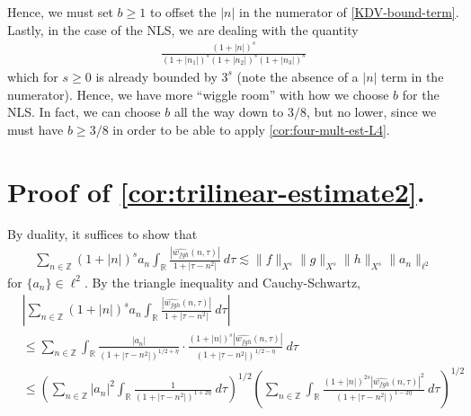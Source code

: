 \documentclass[12pt,reqno]{amsart}
\numberwithin{equation}{section}  %
\numberwithin{figure}{section}
\newcommand{\rr}{\mathbb{R}}
\newcommand{\zz}{\mathbb{Z}}
\newcommand{\wh}{\widehat}
\theoremstyle{plain}
\theoremstyle{definition}
\theoremstyle{remark}
\begin{document}
Hence, we must set $b \ge 1$ to offset the $|n|$ in the numerator of 
\eqref{KDV-bound-term}.
Lastly, in the case of the NLS, we are dealing with the quantity
\begin{equation*}
	\begin{split}
		\frac{\left (1 + |n| \right ) ^s}{\left (1 + |n_1| \right ) ^s \left (1 + |n_2| \right ) ^s \left (1 + |n_3| \right ) ^s} 
	\end{split}
\end{equation*}
which for $s \ge 0$
is already bounded by $3^s$ (note the absence of a $|n|$ term in the
numerator). Hence, we have more ``wiggle room'' with how
we choose $b$ for the NLS. In fact, we can choose $b$ all the way down to $3/8$, but no
lower, since we must have $b \ge 3/8$ in order to be able to apply
\autoref{cor:four-mult-est-L4}. 
%
%
%
%
\section{Proof of \autoref{cor:trilinear-estimate2}.}
By duality, it suffices to show that 
%
\begin{equation*}
	\begin{split}
		\sum_{n \in \zz} \left (1 + |n| \right )^{s}
		a_n \int_{\rr} \frac{|\wh{w_{fgh}}(n, \tau)|}{1 
		+ | \tau - n^2 |} \ d \tau \lesssim \|f\|_{X^s} \|g\|_{X^s} \|h\|_{X^s}
		\|a_n \|_{\ell^2}
	\end{split}
\end{equation*}
%
for $\{a_n\} \in \ell^2$. By the triangle inequality 
and Cauchy-Schwartz,
%
\begin{equation}
	\label{1m}
	\begin{split}
		& | \sum_{n \in \zz} \left (1 + |n| \right )^{s} a_n
		\int_{\rr}\frac{| \wh{w_{fgh}}(n, \tau) |}{1 + | \tau - n^2 |} \ d \tau |
		\\
		& \le \sum_{n \in \zz} \int_{\rr} \frac{| a_n |}{\left( 1 + 
		| \tau - n^2 |
		\right)^{1/2 + \eta}} \cdot \frac{\left( 1 + | n| \right)^s  |
		\wh{w_{fgh}}(n, \tau) |}{\left( 
		1 + | \tau - n^2 | \right)^{1/2 - \eta}} \ d \tau
		\\
		& \le \left( \sum_{n \in \zz} | a_{n} |^2\int_{\rr} \frac{1}{\left( 1 + | \tau - n^2 | \right)^{1 + 2 \eta}} \ d \tau  
		\right)^{1/2} 
		\left ( \sum_{n \in \zz}\int_{\rr} \frac{\left (1 + |n| \right )^{2s} | \wh{w_{fgh}}(n, \tau) 
		|^2}{\left( 1 + | \tau - n^2 | \right)^{1 - 2 \eta}}\ d \tau 
		\right)^{1/2}
	\end{split}
\end{equation}
\end{document}
